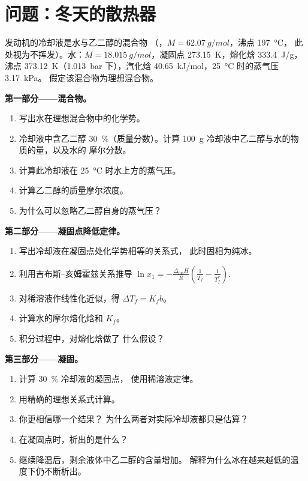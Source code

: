 \section{问题：冬天的散热器}

\begin{problem}
\label{pb:b2:chemical-potential:1}
发动机的冷却液是水与乙二醇的混合物
（，$M = \qty{62.07}{g/mol}$，沸点 \qty{197}{\celsius}，
此处视为不挥发）。水：$M = \qty{18.015}{g/mol}$，凝固点
\qty{273.15}{K}，熔化焓 \qty{333.4}{J/g}，沸点
\qty{373.12}{K}（\qty{1.013}{bar} 下），汽化焓
\qty{40.65}{kJ/mol}，\qty{25}{\celsius} 时的蒸气压 \qty{3.17}{kPa}。
假定该混合物为理想混合物。

\medskip
\noindent\textbf{第一部分——混合物。}
\begin{enumerate}
  \item 写出水在理想混合物中的化学势。
  \item 冷却液中含乙二醇 \qty{30}{\percent}（质量分数）。计算 \qty{100}{g}
        冷却液中乙二醇与水的物质的量，以及水的
        摩尔分数。
  \item 计算此冷却液在
        \qty{25}{\celsius} 时水上方的蒸气压。
  \item 计算乙二醇的质量摩尔浓度。
  \item 为什么可以忽略乙二醇自身的蒸气压？
\end{enumerate}

\medskip
\noindent\textbf{第二部分——凝固点降低定律。}
\begin{enumerate}[resume]
  \item 写出冷却液在凝固点处化学势相等的关系式，
        此时固相为纯冰。
  \item 利用吉布斯–亥姆霍兹关系推导 $\ln x_1 =
        -\frac{\Delta_{\text{fus}}H}{R}\left(\frac1{T_f} - \frac1{T_f^*}\right)$.
  \item 对稀溶液作线性化近似，得 $\Delta T_f = K_f b$。
  \item 计算水的摩尔熔化焓和 $K_f$。
  \item 积分过程中，对熔化焓做了
        什么假设？
\end{enumerate}

\medskip
\noindent\textbf{第三部分——凝固。}
\begin{enumerate}[resume]
  \item 计算 \qty{30}{\percent} 冷却液的凝固点，
        使用稀溶液定律。
  \item 用精确的理想关系式计算。
  \item 你更相信哪一个结果？
        为什么两者对实际冷却液都只是估算？
  \item 在凝固点时，析出的是什么？
  \item 继续降温后，剩余液体中乙二醇的含量增加。
        解释为什么冰在越来越低的温度下仍不断析出。
\end{enumerate}


\end{problem}
